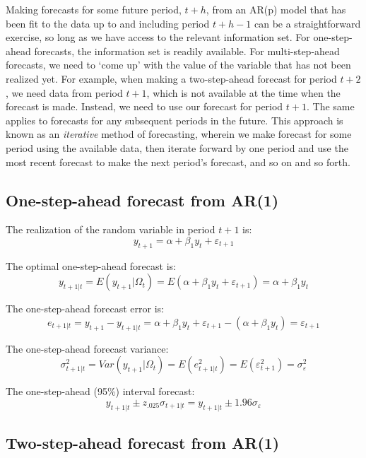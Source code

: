\documentclass[
  12pt,
  oneside]{book}
\begin{document}
Making forecasts for some future period, \(t+h\), from an AR(p) model that has been fit to the data up to and including period \(t+h-1\) can be a straightforward exercise, so long as we have access to the relevant information set. For one-step-ahead forecasts, the information set is readily available. For multi-step-ahead forecasts, we need to `come up' with the value of the variable that has not been realized yet. For example, when making a two-step-ahead forecast for period \(t+2\), we need data from period \(t+1\), which is not available at the time when the forecast is made. Instead, we need to use our forecast for period \(t+1\). The same applies to forecasts for any subsequent periods in the future. This approach is known as an \emph{iterative} method of forecasting, wherein we make forecast for some period using the available data, then iterate forward by one period and use the most recent forecast to make the next period's forecast, and so on and so forth.

\hypertarget{one-step-ahead-forecast-from-ar1}{%
\subsection{One-step-ahead forecast from AR(1)}\label{one-step-ahead-forecast-from-ar1}}

The realization of the random variable in period \(t+1\) is: \[y_{t+1} = \alpha + \beta_1 y_{t} + \varepsilon_{t+1}\]

The optimal one-step-ahead forecast is: \[y_{t+1|t} = E(y_{t+1}|\Omega_t) = E(\alpha + \beta_1 y_{t} + \varepsilon_{t+1}) = \alpha + \beta_1 y_{t}\]

The one-step-ahead forecast error is: \[e_{t+1|t} = y_{t+1} - y_{t+1|t} = \alpha + \beta_1 y_t + \varepsilon_{t+1} - (\alpha + \beta_1 y_t) = \varepsilon_{t+1}\]

The one-step-ahead forecast variance: \[\sigma_{t+1|t}^2 = Var(y_{t+1}|\Omega_t) = E(e_{t+1|t}^2) = E(\varepsilon_{t+1}^2) = \sigma_{\varepsilon}^2\]

The one-step-ahead (95\%) interval forecast: \[y_{t+1|t} \pm z_{.025}\sigma_{t+1|t} = y_{t+1|t} \pm 1.96\sigma_{\varepsilon}\]

\hypertarget{two-step-ahead-forecast-from-ar1}{%
\subsection{Two-step-ahead forecast from AR(1)}\label{two-step-ahead-forecast-from-ar1}}
\end{document}
